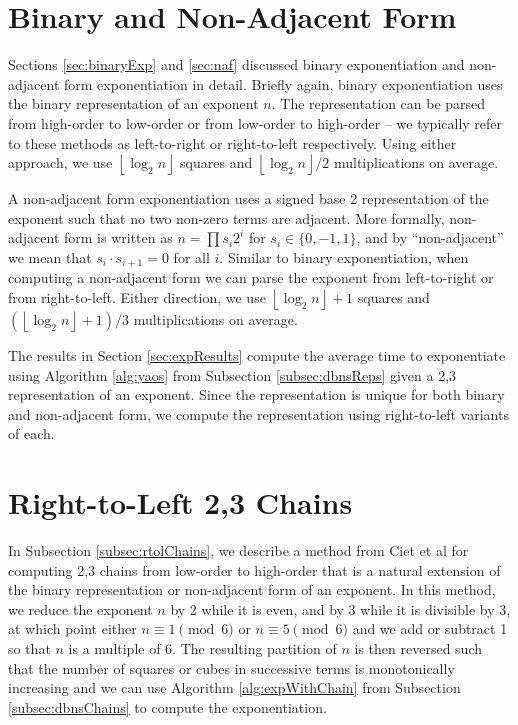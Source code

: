\documentclass{ucalgthes1}
\theoremstyle{definition}
\newcommand{\floor}[1]{\left\lfloor #1 \right\rfloor}
\begin{document}
\section{Binary and Non-Adjacent Form}

Sections \ref{sec:binaryExp} and \ref{sec:naf} discussed binary exponentiation and non-adjacent form exponentiation in detail.  Briefly again, binary exponentiation uses the binary representation of an exponent $n$.  The representation can be parsed from high-order to low-order or from low-order to high-order -- we typically refer to these methods as left-to-right or right-to-left respectively.  Using either approach, we use $\floor{\log_2n}$ squares and $\floor{\log_2n}/2$ multiplications on average.

A non-adjacent form exponentiation uses a signed base 2 representation of the exponent such that no two non-zero terms are adjacent.  More formally, non-adjacent form is written as $n=\prod s_i2^i$ for $s_i \in \{0, -1, 1\}$, and by ``non-adjacent'' we mean that $s_i \cdot s_{i+1} = 0$ for all $i$.  Similar to binary exponentiation, when computing a non-adjacent form we can parse the exponent from left-to-right or from right-to-left.  Either direction, we use $\floor{\log_2n} + 1$ squares and $(\floor{\log_2n}+1)/3$ multiplications on average.

The results in Section \ref{sec:expResults} compute the average time to exponentiate using Algorithm \ref{alg:yaos} from Subsection \ref{subsec:dbnsReps} given a 2,3 representation of an exponent.  Since the representation is unique for both binary and non-adjacent form, we compute the representation using right-to-left variants of each.


\section{Right-to-Left 2,3 Chains}
\label{sec:expR2LChains}

In Subsection \ref{subsec:rtolChains}, we describe a method from Ciet et al \cite[Figure 8]{Ciet2006} for computing 2,3 chains from low-order to high-order that is a natural extension of the binary representation or non-adjacent form of an exponent.  In this method, we reduce the exponent $n$ by 2 while it is even, and by 3 while it is divisible by 3, at which point either $n \equiv 1 \pmod 6$ or $n \equiv 5 \pmod 6$ and we add or subtract 1 so that $n$ is a multiple of 6.  The resulting partition of $n$ is then reversed such that the number of squares or cubes in successive terms is monotonically increasing and we can use Algorithm \ref{alg:expWithChain} from Subsection \ref{subsec:dbnsChains} to compute the exponentiation.
\end{document}
